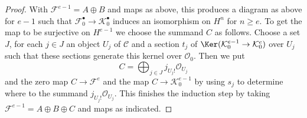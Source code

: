 \begin{proof}
\medskip\noindent
With $\mathcal{F}^{e - 1} = A \oplus B$ and maps as above,
this produces a diagram as above for $e - 1$ such that
$\mathcal{F}_0^\bullet \to \mathcal{K}_0^\bullet$
induces an isomorphism on $H^n$ for $n \geq e$.
To get the map to be surjective on $H^{e - 1}$ we choose
the summand $C$ as follows.
Choose a set $J$, for each $j \in J$ an object $U_j$ of $\mathcal{C}$
and a section $t_j$ of $\Ker(\mathcal{K}^{e - 1}_0 \to \mathcal{K}^e_0)$
over $U_j$ such that these sections generate this kernel over
$\mathcal{O}_0$. Then we put
$$
C = \bigoplus\nolimits_{j \in J} j_{U_j!}\mathcal{O}_{U_j}
$$
and the zero map $C \to \mathcal{F}^e$ and the map
$C \to \mathcal{K}_0^{e - 1}$ by using $s_j$ to determine where to the summand
$j_{U_j!}\mathcal{O}_{U_j}$. This finishes the induction step
by taking $\mathcal{F}^{e - 1} = A \oplus B \oplus C$ and
maps as indicated.
\end{proof}
